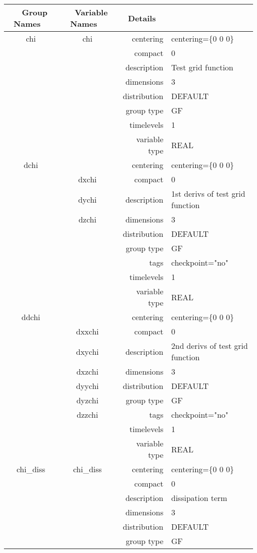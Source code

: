 \begin{tabular*}{150mm}{|c|c@{\extracolsep{\fill}}|rl|} \hline 
~ {\bf Group Names} ~ & ~ {\bf Variable Names} ~  &{\bf Details} ~ & ~\\ 
\hline 
chi & chi & centering & centering=\{0 0 0\} \\ 
 &  & compact & 0 \\ 
 &  & description & Test grid function \\ 
 &  & dimensions & 3 \\ 
 &  & distribution & DEFAULT \\ 
 &  & group type & GF \\ 
 &  & timelevels & 1 \\ 
 &  & variable type & REAL \\ 
\hline 
dchi &  & centering & centering=\{0 0 0\} \\ 
 & dxchi & compact & 0 \\ 
 & dychi & description & 1st derivs of test grid function \\ 
 & dzchi & dimensions & 3 \\ 
 &  & distribution & DEFAULT \\ 
 &  & group type & GF \\ 
 &  & tags & checkpoint="no" \\ 
 &  & timelevels & 1 \\ 
 &  & variable type & REAL \\ 
\hline 
ddchi &  & centering & centering=\{0 0 0\} \\ 
 & dxxchi & compact & 0 \\ 
 & dxychi & description & 2nd derivs of test grid function \\ 
 & dxzchi & dimensions & 3 \\ 
 & dyychi & distribution & DEFAULT \\ 
 & dyzchi & group type & GF \\ 
 & dzzchi & tags & checkpoint="no" \\ 
 &  & timelevels & 1 \\ 
 &  & variable type & REAL \\ 
\hline 
chi\_diss & chi\_diss & centering & centering=\{0 0 0\} \\ 
 &  & compact & 0 \\ 
 &  & description & dissipation term \\ 
 &  & dimensions & 3 \\ 
 &  & distribution & DEFAULT \\ 
 &  & group type & GF \\ 

\end{tabular*}
